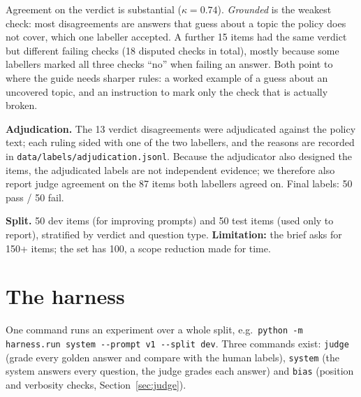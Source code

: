 \documentclass[10pt,a4paper]{article}
\newcommand{\code}[1]{\texttt{#1}}
\begin{document}
Agreement on the verdict is substantial ($\kappa=0.74$). \emph{Grounded} is the weakest check: most disagreements are answers that guess about a topic the policy does not cover, which one labeller accepted. A further 15 items had the same verdict but different failing checks (18 disputed checks in total), mostly because some labellers marked all three checks ``no'' when failing an answer. Both point to where the guide needs sharper rules: a worked example of a guess about an uncovered topic, and an instruction to mark only the check that is actually broken.

\textbf{Adjudication.} The 13 verdict disagreements were adjudicated against the policy text; each ruling sided with one of the two labellers, and the reasons are recorded in \code{data/labels/adjudication.jsonl}. Because the adjudicator also designed the items, the adjudicated labels are not independent evidence; we therefore also report judge agreement on the 87 items both labellers agreed on. Final labels: 50 pass / 50 fail.

\textbf{Split.} 50 dev items (for improving prompts) and 50 test items (used only to report), stratified by verdict and question type. \textbf{Limitation:} the brief asks for 150+ items; the set has 100, a scope reduction made for time.

\section{The harness}

One command runs an experiment over a whole split, e.g.\ \code{python -m harness.run system -{}-prompt v1 -{}-split dev}. Three commands exist: \code{judge} (grade every golden answer and compare with the human labels), \code{system} (the system answers every question, the judge grades each answer) and \code{bias} (position and verbosity checks, Section~\ref{sec:judge}).
\end{document}
